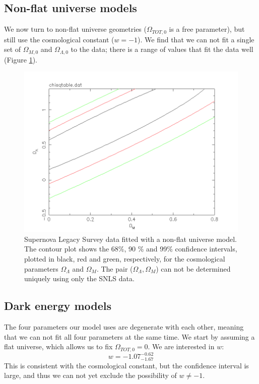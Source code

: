 \documentclass[11pt]{article}
\begin{document}
\subsection{Non-flat universe models} \label{sec:nonflat}
We now turn to non-flat universe geometries ($\Omega_{TOT,0} $ is a free parameter), but still use the cosmological constant ($w = -1$). We find that we can not fit a single set of $\Omega_{M,0}$ and $\Omega_{\Lambda,0}$ to the data; there is a range of values that fit the data well (Figure \ref{fig:nonflat}). 
\begin{figure}[htbp]
	\centering
	\includegraphics[width=0.8\linewidth]{nonflat.png}
	\caption{Supernova Legacy Survey data fitted with a non-flat universe model. The contour plot shows the 68\%, 90 \% and 99\% confidence intervals, plotted in black, red and green, respectively, for the cosmological parameters $\Omega_\Lambda$ and $\Omega_M$. The pair ($\Omega_\Lambda, \Omega_M$) can not be determined uniquely using only the SNLS data.}
	\label{fig:nonflat}
\end{figure}

\subsection{Dark energy models} \label{sec:dark}
The four parameters our model uses are degenerate with each other, meaning that we can not fit all four parameters at the same time. We start by assuming a flat universe, which allows us to fix $\Omega_{TOT,0} = 0$. We are interested in $w$:
\begin{equation}
	w= -1.07^{-0.62}_{-1.67}
	\label{res:w}
\end{equation}
This is consistent with the cosmological constant, but the confidence interval is large, and thus we can not yet exclude the possibility of $w \neq -1$.
\end{document}
